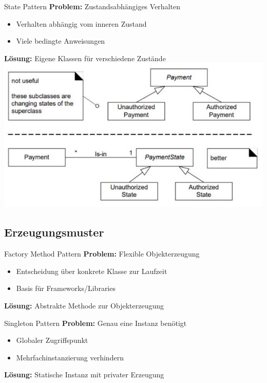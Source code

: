 \begin{definition}{State Pattern}
\textbf{Problem:} Zustandsabhängiges Verhalten
\begin{itemize}
    \item Verhalten abhängig vom inneren Zustand
    \item Viele bedingte Anweisungen
\end{itemize}
\textbf{Lösung:} Eigene Klassen für verschiedene Zustände
\includegraphics[width=0.7\linewidth]{images/2024_12_29_0d1d7b5551ea1b4b41bdg-07(1)}
\end{definition}

\subsection{Erzeugungsmuster}

\begin{definition}{Factory Method Pattern}
\textbf{Problem:} Flexible Objekterzeugung
\begin{itemize}
    \item Entscheidung über konkrete Klasse zur Laufzeit
    \item Basis für Frameworks/Libraries
\end{itemize}
\textbf{Lösung:} Abstrakte Methode zur Objekterzeugung
\end{definition}

\begin{definition}{Singleton Pattern}
\textbf{Problem:} Genau eine Instanz benötigt
\begin{itemize}
    \item Globaler Zugriffspunkt
    \item Mehrfachinstanzierung verhindern
\end{itemize}
\textbf{Lösung:} Statische Instanz mit privater Erzeugung
\end{definition}

